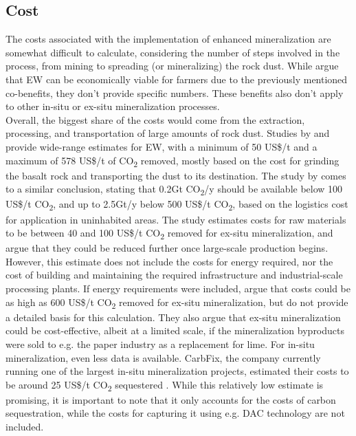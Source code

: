 \subsection*{Cost}
The costs associated with the implementation of enhanced mineralization are somewhat difficult to calculate, considering the number of steps involved in the process, from mining to spreading (or mineralizing) the rock dust. While \textcite{Almaraz2022MethodsSettings} argue that EW can be economically viable for farmers due to the previously mentioned co-benefits, they don't provide specific numbers. These benefits also don't apply to other in-situ or ex-situ mineralization processes. \\
Overall, the biggest share of the costs would come from the extraction, processing, and transportation of large amounts of rock dust. Studies by \textcite{Beerling2018FarmingSecurity} and \textcite{Fuss2018NegativeEffects} provide wide-range estimates for EW, with a minimum of 50 US\$/t and a maximum of 578 US\$/t of CO\textsubscript{2} removed, mostly based on the cost for grinding the basalt rock and transporting the dust to its destination. The study by \textcite{Goll2021PotentialRock} comes to a similar conclusion, stating that 0.2Gt CO\textsubscript{2}/y should be available below 100 US\$/t CO\textsubscript{2}, and up to 2.5Gt/y below 500 US\$/t CO\textsubscript{2}, based on the logistics cost for application in uninhabited areas.
The \textcite{Lackner1997ProgressSubstrates} study estimates costs for raw materials to be between 40 and 100 US\$/t CO\textsubscript{2} removed for ex-situ mineralization, and argue that they could be reduced further once large-scale production begins. However, this estimate does not include the costs for energy required, nor the cost of building and maintaining the required infrastructure and industrial-scale processing plants. If energy requirements were included, \textcite{Lawler2021CarbonMineralization} argue that costs could be as high as 600 US\$/t CO\textsubscript{2} removed for ex-situ mineralization, but do not provide a detailed basis for this calculation. They also argue that ex-situ mineralization could be cost-effective, albeit at a limited scale, if the mineralization byproducts were sold to e.g. the paper industry as a replacement for lime. For in-situ mineralization, even less data is available. CarbFix, the company currently running one of the largest in-situ mineralization projects, estimated their costs to be around 25 US\$/t CO\textsubscript{2} sequestered \parencite{Lawler2021CarbonMineralization}. While this relatively low estimate is promising, it is important to note that it only accounts for the costs of carbon sequestration, while the costs for capturing it using e.g. DAC technology are not included.
